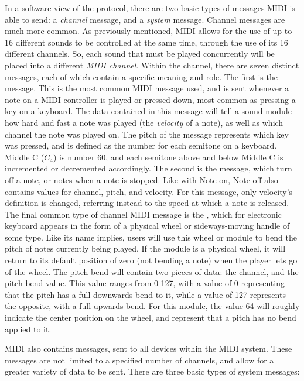 In a software view of the protocol, there are two basic types of messages MIDI is able to send: a \textit{channel} message, and a \textit{system} message. Channel messages are much more common. As previously mentioned, MIDI allows for the use of up to 16 different sounds to be controlled at the same time, through the use of its 16 different channels. So, each sound that must be played concurrently will be placed into a different \textit{MIDI channel}. Within the channel, there are seven distinct messages, each of which contain a specific meaning and role. The first is the  message. This is the most common MIDI message used, and is sent whenever a note on a MIDI controller is played or pressed down, most common as pressing a key on a keyboard. The data contained in this message will tell a sound module how hard and fast a note was played (the \textit{velocity} of a note), as well as which channel the note was played on\cite{Romano_2003}. The pitch of the message represents which key was pressed, and is defined as the number for each semitone on a keyboard. Middle C ($C_4$) is number 60, and each semitone above and below Middle C is incremented or decremented accordingly\cite{Kirk_Hunt_2013}. The second is the  message, which turn off a note, or notes when a note is stopped. Like with Note on, Note off also contains values for channel, pitch, and velocity. For this message, only velocity's definition is changed, referring instead to the speed at which a note is released. The final common type of channel MIDI message is the , which for electronic keyboard appears in the form of a physical wheel or sideways-moving handle of some type. Like its name implies, users will use this wheel or module to bend the pitch of notes currently being played. If the module is a physical wheel, it will return to its default position of zero (not bending a note) when the player lets go of the wheel. The pitch-bend will contain two pieces of data: the channel, and the pitch bend value. This value ranges from 0-127, with a value of 0 representing that the pitch has a full downwards bend to it, while a value of 127 represents the opposite, with a full upwards bend\cite{Kirk_Hunt_2013}. For this module, the value 64 will roughly indicate the center position on the wheel, and represent that a pitch has no bend applied to it.

MIDI also contains  messages, sent to all devices within the MIDI system\cite{Romano_2003}. These messages are not limited to a specified number of channels, and allow for a greater variety of data to be sent. There are three basic types of system messages\cite{Kirk_Hunt_2013}:

